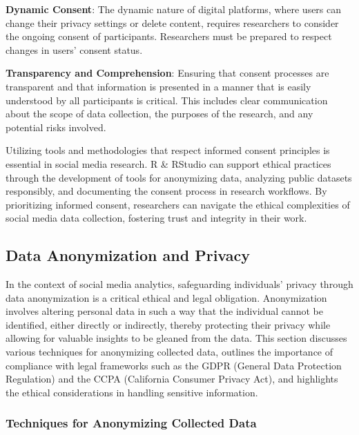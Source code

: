 \documentclass[
]{book}
\begin{document}
\textbf{Dynamic Consent}: The dynamic nature of digital platforms, where users can change their privacy settings or delete content, requires researchers to consider the ongoing consent of participants. Researchers must be prepared to respect changes in users' consent status.

\textbf{Transparency and Comprehension}: Ensuring that consent processes are transparent and that information is presented in a manner that is easily understood by all participants is critical. This includes clear communication about the scope of data collection, the purposes of the research, and any potential risks involved.

Utilizing tools and methodologies that respect informed consent principles is essential in social media research. R \& RStudio can support ethical practices through the development of tools for anonymizing data, analyzing public datasets responsibly, and documenting the consent process in research workflows. By prioritizing informed consent, researchers can navigate the ethical complexities of social media data collection, fostering trust and integrity in their work.

\hypertarget{data-anonymization-and-privacy}{%
\subsection*{Data Anonymization and Privacy}\label{data-anonymization-and-privacy}}

In the context of social media analytics, safeguarding individuals' privacy through data anonymization is a critical ethical and legal obligation. Anonymization involves altering personal data in such a way that the individual cannot be identified, either directly or indirectly, thereby protecting their privacy while allowing for valuable insights to be gleaned from the data. This section discusses various techniques for anonymizing collected data, outlines the importance of compliance with legal frameworks such as the GDPR (General Data Protection Regulation) and the CCPA (California Consumer Privacy Act), and highlights the ethical considerations in handling sensitive information.

\hypertarget{techniques-for-anonymizing-collected-data}{%
\subsubsection*{Techniques for Anonymizing Collected Data}\label{techniques-for-anonymizing-collected-data}}
\end{document}

